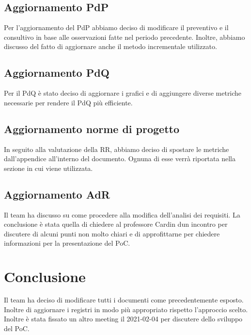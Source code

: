 \subsection{Aggiornamento PdP}
Per l'aggiornamento del PdP abbiamo deciso di modificare il preventivo e il consultivo in base alle osservazioni fatte nel periodo precedente. 
Inoltre, abbiamo discusso del fatto di aggiornare anche il metodo incrementale utilizzato. 

\subsection{Aggiornamento PdQ}
Per il PdQ è stato deciso di aggiornare i grafici e di aggiungere diverse metriche necessarie per rendere il PdQ più efficiente.

\subsection{Aggiornamento norme di progetto}
In seguito alla valutazione della RR, abbiamo deciso di spostare le metriche dall'appendice all'interno del documento.
Ognuna di esse verrà riportata nella sezione in cui viene utilizzata.

\subsection{Aggiornamento AdR}
Il team ha discusso su come procedere alla modifica dell'analisi dei requisiti. La conclusione è stata quella di chiedere al professore Cardin dun incontro per discutere di alcuni punti non molto chiari e di approfittarne per chiedere informazioni per la presentazione del PoC.

\section{Conclusione}
Il team ha deciso di modificare tutti i documenti come precedentemente esposto. Inoltre di aggiornare i registri in modo più appropriato rispetto l'approccio scelto.
Inoltre è stata fissato un altro meeting il 2021-02-04 per discutere dello sviluppo del PoC.

